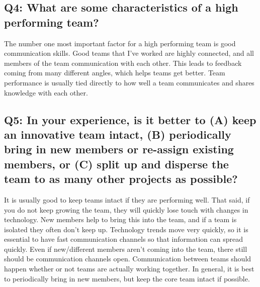 \subsection*{Q4: What are some characteristics of a high performing team?}
The number one most important factor for a high performing team is good communication skills. Good teams that I've worked are highly connected, and all members of the team communication with each other. This leads to feedback coming from many different angles, which helps teams get better. Team performance is usually tied directly to how well a team communicates and shares knowledge with each other.


\subsection*{Q5: In your experience, is it better to (A) keep an innovative team intact, (B) periodically bring in new members or re-assign existing members, or (C) split up and disperse the team to as many other projects as possible?}
It is usually good to keep teams intact if they are performing well. That said, if you do not keep growing the team, they will quickly lose touch with changes in technology. New members help to bring this into the team, and if a team is isolated they often don't keep up. Technology trends move very quickly, so it is essential to have fast communication channels so that information can spread quickly. Even if new/different members aren't coming into the team, there still should be communication channels open. Communication between teams should happen whether or not teams are actually working together. In general, it is best to periodically bring in new members, but keep the core team intact if possible.